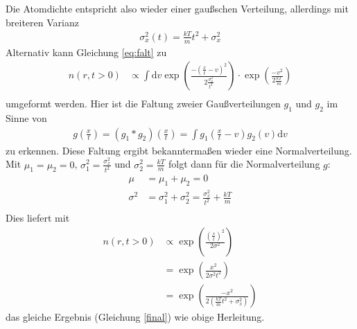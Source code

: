 \documentclass[10pt,a4paper]{extarticle}
\begin{document}
Die Atomdichte entspricht also wieder einer gaußschen Verteilung, allerdings mit breiteren Varianz
\begin{align}
\sigma_x^2 \left(t\right) = \frac{kT}{m}t^2 + \sigma_x^2 \label{final} 
\end{align}
Alternativ kann Gleichung \eqref{eq:falt} zu 
\begin{align}
n(r, t> 0) &\varpropto \int \mathrm{d}v \exp\left(\frac{-(\frac{x}{t}-v)^2}{2 \frac{\sigma_x^2}{t^2}}\right) \cdot \exp \left(\frac{-v^2}{2\frac{kT}{m}}\right) \\
\end{align}
umgeformt werden.
Hier ist die Faltung zweier Gaußverteilungen $g_1$ und $g_2$ im Sinne von
\begin{align}
g \left(\frac{x}{t}\right) = \left(g_1 * g_2\right) \left(\frac{x}{t}\right) = \int  g_1\left(\frac{x}{t}-v\right) g_2 \left(v\right)\mathrm{d}v
\end{align}
zu erkennen.
Diese Faltung ergibt bekanntermaßen wieder eine Normalverteilung.
Mit $\mu_1 = \mu_2 = 0$, $\sigma_1^2 = \frac{\sigma_x^2}{t^2}$ und $\sigma_2^2 = \frac{kT}{m}$ folgt dann für die Normalverteilung $g$:
\begin{align}
\mu &= \mu_1 + \mu_2 = 0 \\
\sigma^2 &= \sigma_1^2 + \sigma_2^2 =  \frac{\sigma_x^2}{t^2} + \frac{kT}{m}\\
\end{align}
Dies liefert mit 
\begin{align}
n(r, t> 0) &\varpropto \exp\left(\frac{\left(\frac{x}{t}\right)^2}{2 \sigma^2}\right) \\
&= \exp\left(\frac{x^2}{2 \sigma^2 t^2}\right) \\
&= \exp\left(\frac{- x^2 }{2\left(\frac{kT}{m}t^2 + \sigma_x^2\right)}\right) 
\end{align}
das gleiche Ergebnis (Gleichung \eqref{final}) wie obige Herleitung.
\end{document}
